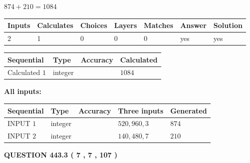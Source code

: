 \documentclass{ctexart}
\begin{document}
 

$ %
874 +  %
210=   %
1084$
 
 
\noindent{}
 
 

 
   
   
   
   
\noindent\begin{tabular}{|l|l|l|l|l|l|l|}
 \hline
Inputs & Calculates & Choices & Layers & Matches & Answer & Solution \\ \hline
 2  & 
 1  & 
 0
  & 
 0  & 
 0  & 
  yes & 
  yes 
  \\ \hline
 \end{tabular}
   
   
   
   
\noindent{}
   
   
  
  
\noindent\begin{tabular}{|l|l|l|l|}
\hline
 Sequential & Type & Accuracy & Calculated \\ 
\hline
 
 
  Calculated $  1 $ & integer &  & 
  $ 1084 $ 
 \\  \hline  
 \end{tabular}
   
   
   
   
\noindent\vspace{0.1in}\hspace{-0.08in} {\textbf{\Large{All inputs: }}}
   
   
  
  
\noindent\begin{tabular}{|l|l|l|l|l|}
\hline
 Sequential & Type & Accuracy & Three inputs & Generated \\ 
\hline
 
 
  INPUT $  1 $ & integer &  & $
 520
 , 
 960
 , 
 3
 $ & $ 874 $ 
 \\  \hline  
 
 
  INPUT $  2 $ & integer &  & $
 140
 , 
 480
 , 
 7
 $ & $ 210 $ 
 \\  \hline  
 \end{tabular}
   
   
  
\vspace{0.2in}
  
{\textbf{\Large{QUESTION
443.3 
 ( 7 , 7 , 107 )
}}}
  
\end{document}
